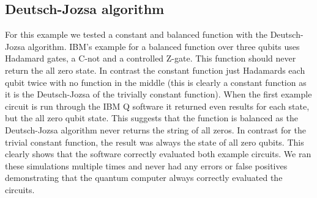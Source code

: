 \documentclass[12pt]{article}
\begin{document}
    \subsection{Deutsch-Jozsa algorithm}
        For this example we tested a constant and balanced function with the Deutsch-Jozsa algorithm. IBM's example for a balanced function over three qubits uses Hadamard gates, a C-not and a controlled Z-gate. This function should never return the all zero state. In contrast the constant function just Hadamards each qubit twice with no function in the middle (this is clearly a constant function as it is the Deutsch-Jozsa of the trivially constant function). When the first example circuit is run through the IBM Q software it returned even results for each state, but the all zero qubit state. This suggests that the function is balanced as the Deutsch-Jozsa algorithm never returns the string of all zeros. In contrast for the trivial constant function, the result was always the state of all zero qubits. This clearly shows that the software correctly evaluated both example circuits. We ran these simulations multiple times and never had any errors or false positives demonstrating that the quantum computer always correctly evaluated the circuits.
\end{document}
